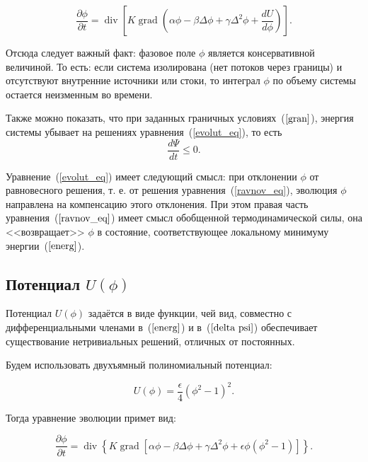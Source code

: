 \begin{equation*}
    \frac{\partial \phi}{\partial t} = \operatorname{div}\left[K \operatorname{grad}\left(\alpha \phi - \beta \Delta \phi + \gamma \Delta^2 \phi + \frac{dU}{d\phi}\right)\right].
\end{equation*}

Отсюда следует важный факт: фазовое поле $\phi$ является консервативной величиной. То есть: если система изолирована (нет потоков через границы) и отсутствуют внутренние источники или стоки, то интеграл $\phi$ по объему системы остается неизменным во времени.

Также можно показать, что при заданных граничных условиях~($\ref{gran}$), энергия системы убывает на решениях уравнения~(\ref{evolut_eq}), то есть 
\begin{equation*}
    \frac{d \Psi}{d t} \leqslant 0.
\end{equation*}

Уравнение~(\ref{evolut_eq}) имеет следующий смысл: при отклонении $\phi$ от равновесного решения, т. е. от решения уравнения~(\ref{ravnov_eq}), эволюция $\phi$ направлена на компенсацию этого отклонения.
При этом правая часть уравнения~($\ref{ravnov_eq}$) имеет смысл обобщенной термодинамической силы, она <<возвращает>> $\phi$ в состояние, соответствующее локальному минимуму энергии~($\ref{energ}$).

\subsection{Потенциал $U(\phi)$}

Потенциал $U(\phi)$ задаётся в виде функции, чей вид, совместно с дифференциальными членами в~($\ref{energ}$) и в~($\ref{delta psi}$) обеспечивает существование нетривиальных решений, отличных от постоянных.

Будем использовать двухъямный полиномиальный потенциал:

\begin{equation*}
U(\phi) = \frac{\epsilon}{4}(\phi^2 - 1)^2.
\end{equation*}

Тогда уравнение эволюции примет вид:

\begin{equation} \label{evolution_eq}
\frac{\partial \phi}{\partial t} = \operatorname{div}\left\{K \operatorname{grad}\left[ \alpha \phi - \beta \Delta \phi + \gamma \Delta^2 \phi  + \epsilon \phi (\phi^2 - 1)\right]\right\}.
\end{equation}

